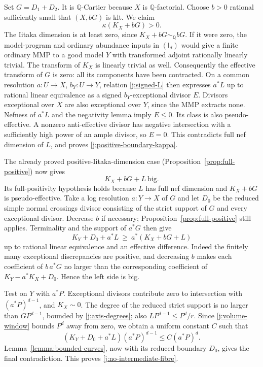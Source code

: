 \documentclass[12pt,a4paper,psamsfonts]{amsart}
\theoremstyle{definition}
\theoremstyle{plain}
\newcommand{\Q}{\mathbb Q}
\begin{document}
Set $G=D_1+D_2$. It is $\Q$-Cartier because $X$ is
$\Q$-factorial. Choose $b>0$ rational sufficiently small that
$(X,bG)$ is klt. We claim
\begin{equation}\label{j:positive-boundary-kappa}
                         \kappa(K_X+bG)>0.
\end{equation}
The Iitaka dimension is at least zero, since
$K_X+bG\sim_\Q bG$. If it were zero, the model-program and ordinary abundance inputs in
$(\mathsf I_d)$ would give a finite ordinary MMP to a
good model $Y$ with transformed adjoint rationally linearly
trivial. The transform of $K_X$ is linearly trivial as well.
Consequently the effective transform of $G$ is zero: all its
components have been contracted. On a common resolution
$a:U\to X$, $b_Y:U\to Y$, relation \eqref{j:signed-L} then
expresses $a^*L$ up to rational linear equivalence as a signed
$b_Y$-exceptional divisor $E$. Divisors exceptional over $X$ are
also exceptional over $Y$, since the MMP extracts none.
Nefness of $a^*L$ and the negativity lemma imply $E\le0$.
Its class is also pseudo-effective. A nonzero anti-effective
divisor has negative intersection with a sufficiently high power
of an ample divisor, so $E=0$. This contradicts full nef dimension
of $L$, and proves \eqref{j:positive-boundary-kappa}.

The already proved positive-Iitaka-dimension case
(Proposition~\ref{prop:full-positive}) now gives
\[
                         K_X+bG+L\ \text{big}.
\]
Its full-positivity hypothesis holds because $L$ has full nef
dimension and $K_X+bG$ is pseudo-effective.
Take a log resolution $a:Y\to X$ of $G$ and let $D_0$ be the
reduced simple normal crossings divisor consisting of the strict
support of $G$ and every exceptional divisor. Decrease $b$ if
necessary; Proposition~\ref{prop:full-positive} still applies.
Terminality and the support of $a^*G$ then give
\[
 K_Y+D_0+a^*L\ \ge\ a^*(K_X+bG+L)
\]
up to rational linear equivalence and an effective difference.
Indeed the finitely many exceptional discrepancies are positive,
and decreasing $b$ makes each coefficient of $b\,a^*G$ no larger
than the corresponding coefficient of $K_Y-a^*K_X+D_0$.
Hence the left side is big.

Test on $Y$ with $a^*P$. Exceptional divisors contribute zero to
intersection with $(a^*P)^{d-1}$, and $K_X\sim0$. The degree of
the reduced strict support is no larger than $GP^{d-1}$, bounded
by \eqref{j:axis-degrees}; also
$LP^{d-1}\le P^d/r$. Since \eqref{j:volume-window} bounds $P^d$
away from zero, we obtain a uniform constant $C$ such that
\[
 (K_Y+D_0+a^*L)(a^*P)^{d-1}\le C(a^*P)^d.
\]
Lemma~\ref{lemma:bounded-curves}, now with its reduced boundary
$D_0$, gives the final contradiction. This proves
\eqref{j:no-intermediate-fibre}.
\end{document}
